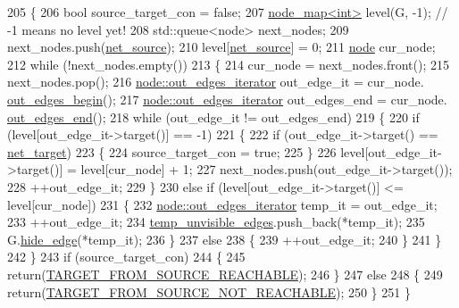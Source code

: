 \begin{DoxyCode}
205 \{
206     \textcolor{keywordtype}{bool} source\_target\_con = \textcolor{keyword}{false};
207     \mbox{\hyperlink{classnode__map}{node\_map<int>}} level(G, -1);    \textcolor{comment}{// -1 means no level yet!}
208     std::queue<node> next\_nodes;
209     next\_nodes.push(\mbox{\hyperlink{classmaxflow__pp_a20f2d05465acc2d7b777ea8025d12003}{net\_source}});
210     level[\mbox{\hyperlink{classmaxflow__pp_a20f2d05465acc2d7b777ea8025d12003}{net\_source}}] = 0;
211     \mbox{\hyperlink{classnode}{node}} cur\_node;
212     \textcolor{keywordflow}{while} (!next\_nodes.empty())
213     \{
214     cur\_node = next\_nodes.front();
215     next\_nodes.pop();
216     \mbox{\hyperlink{classnode_a90e17ed34de55072e8077f4367499a98}{node::out\_edges\_iterator}} out\_edge\_it = cur\_node.
      \mbox{\hyperlink{classnode_a7dcb80df22118cea04f77ca8c952d9c2}{out\_edges\_begin}}();
217     \mbox{\hyperlink{classnode_a90e17ed34de55072e8077f4367499a98}{node::out\_edges\_iterator}} out\_edges\_end = cur\_node.
      \mbox{\hyperlink{classnode_a7ce2ba5195a63d4df6b44299a02a9378}{out\_edges\_end}}();
218     \textcolor{keywordflow}{while} (out\_edge\_it != out\_edges\_end)
219     \{
220         \textcolor{keywordflow}{if} (level[out\_edge\_it->target()] == -1)
221         \{
222         \textcolor{keywordflow}{if} (out\_edge\_it->target() == \mbox{\hyperlink{classmaxflow__pp_a10f0b047011e04cb4816a824da5b7892}{net\_target}})
223         \{
224             source\_target\_con = \textcolor{keyword}{true};
225         \}
226         level[out\_edge\_it->target()] = level[cur\_node] + 1;
227         next\_nodes.push(out\_edge\_it->target());
228         ++out\_edge\_it;
229         \}
230         \textcolor{keywordflow}{else} \textcolor{keywordflow}{if} (level[out\_edge\_it->target()] <= level[cur\_node])
231         \{
232         \mbox{\hyperlink{classnode_a90e17ed34de55072e8077f4367499a98}{node::out\_edges\_iterator}} temp\_it = out\_edge\_it;
233         ++out\_edge\_it;
234         \mbox{\hyperlink{classmaxflow__pp_aae17915904c0d17632df70aac9fe88b0}{temp\_unvisible\_edges}}.push\_back(*temp\_it);
235         G.\mbox{\hyperlink{classgraph_ab2f8520bcac080d73c55228fecc61825}{hide\_edge}}(*temp\_it);
236         \}
237         \textcolor{keywordflow}{else}
238         \{
239         ++out\_edge\_it;
240         \}
241     \}
242     \}
243     \textcolor{keywordflow}{if} (source\_target\_con)
244     \{
245     \textcolor{keywordflow}{return}(\mbox{\hyperlink{classmaxflow__pp_abd042f1baa6a6200b5bbed755f400d2da54cf9dadeb9ec5994a80e0237d9f2872}{TARGET\_FROM\_SOURCE\_REACHABLE}});
246     \}
247     \textcolor{keywordflow}{else}
248     \{
249     \textcolor{keywordflow}{return}(\mbox{\hyperlink{classmaxflow__pp_abd042f1baa6a6200b5bbed755f400d2dac84c2bfbc74bc6ee5535b2c212502c02}{TARGET\_FROM\_SOURCE\_NOT\_REACHABLE}});
250     \}
251 \}
\end{DoxyCode}

